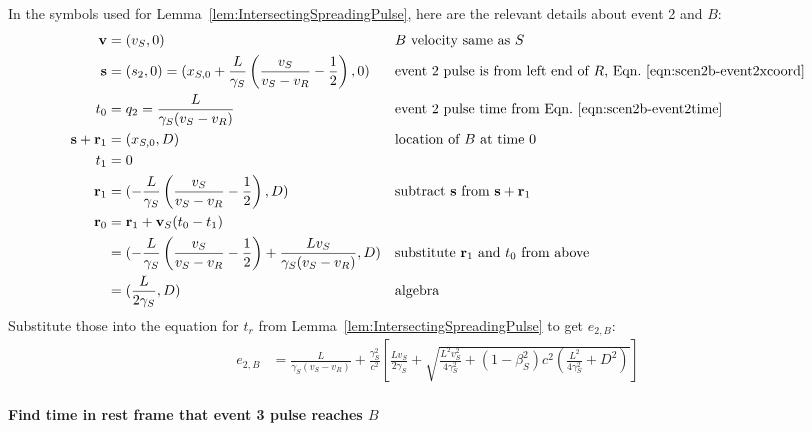 \documentclass[a4paper]{article}
\theoremstyle{plain}
\theoremstyle{definition}
\newcommand{\vect}[1]{\mathbf{#1}}
\begin{document}
In the symbols used for Lemma~\ref{lem:IntersectingSpreadingPulse},
here are the relevant details about event 2 and $B$:
\begin{align*}
\vect{v} & = (v_S, 0) & & \text{$B$ velocity same as $S$} \\
\vect{s} & = (s_2,0) = (x_{S,0} + \frac{L}{\gamma_S} \left( \frac{v_S}{v_S - v_R} - \frac{1}{2} \right), 0) & & \text{event 2 pulse is from left end of $R$, Eqn.~\eqref{eqn:scen2b-event2xcoord}} \\
t_0 & = q_2 = \frac{L}{\gamma_S(v_S - v_R)} & & \text{event 2 pulse time from Eqn.~\eqref{eqn:scen2b-event2time}} \\
\vect{s} + \vect{r}_1 & = (x_{S,0}, D) & & \text{location of $B$ at time 0} \\
t_1 & = 0 \\
\vect{r}_1 & = (-\frac{L}{\gamma_S} \left( \frac{v_S}{v_S - v_R} - \frac{1}{2} \right), D) & & \text{subtract $\vect{s}$ from $\vect{s}+\vect{r}_1$} \\
\vect{r}_0
  & = \vect{r}_1 + \vect{v}_S(t_0-t_1) \\
  & = (-\frac{L}{\gamma_S} \left( \frac{v_S}{v_S - v_R} - \frac{1}{2} \right) + \frac{Lv_S}{\gamma_S(v_S - v_R)}, D) & & \text{substitute $\vect{r}_1$ and $t_0$ from above} \\
  & = (\frac{L}{2\gamma_S}, D) & & \text{algebra}
\end{align*}
Substitute those into the equation for $t_r$ from
Lemma~\ref{lem:IntersectingSpreadingPulse} to get $e_{2,B}$:
\begin{align*}
e_{2,B} & = \frac{L}{\gamma_S(v_S - v_R)} + \frac{\gamma_S^2}{c^2} \left[ \frac{Lv_S}{2\gamma_S} + \sqrt{\frac{L^2v_S^2}{4\gamma_S^2} + (1-\beta_S^2)c^2 (\frac{L^2}{4\gamma_S^2} + D^2)} \right]
\end{align*}


\paragraph{Find time in rest frame that event 3 pulse reaches $B$}
\end{document}
